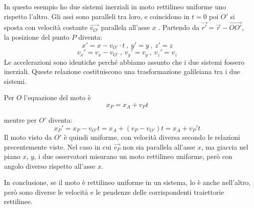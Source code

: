 \documentclass[class=book, crop=false, oneside, 12pt]{standalone}
\begin{document}
In questo esempio ho due sistemi inerziali in moto rettilineo uniforme uno rispetto l'altro.
Gli assi sono paralleli tra loro, e coincidono in \(t = 0\) poi \(O'\) si sposta con velocità costante \(\overrightarrow{v_{O'}}\) parallela all'asse \(x\) .
Partendo da \(\overrightarrow{r'} = \overrightarrow{r} - \overrightarrow{OO'}\), la posizione del punto \(P\) diventa:
\begin{equation*}
    x' = x - v_{O'} \cdot t \ , \ y' = y \ , \ z' = z
\end{equation*}
\begin{equation*}
    v_x' = v_x - v_{O'} \ , \ v_y ' = v_y \ , \ v_z ' = v_z
\end{equation*}
Le accelerazioni sono identiche perché abbiamo assunto che i due sistemi fossero inerziali.
Queste relazione costituiscono una trasformazione galileiana tra i due sistemi.

Per \(O\) l'equazione del moto è
\begin{equation*}
    x_P = x_A + v_P t
\end{equation*}

mentre per \(O'\) diventa:
\begin{equation*}
    x_P' = x_P - v_{O'} t = x_A + (v_P - v_{O'}) t = x_A + v_P' t
\end{equation*}
Il moto visto da \(O '\) è quindi uniforme, con velocità diversa secondo le relazioni precentemente viste.
Nel caso in cui \(\overrightarrow{v_P}\) non sia parallela all'asse \(x\), ma giaccia nel piano \(x\), \(y\), i due osservatori misurano un moto rettilineo uniforme, però con angolo diverso rispetto all'asse \(x\).

In conclusione, se il moto è rettilineo uniforme in un sistema, lo è anche nell'altro, però sono diverse le velocità e le pendenze delle corrispondenti traiettorie rettilinee.
\end{document}

